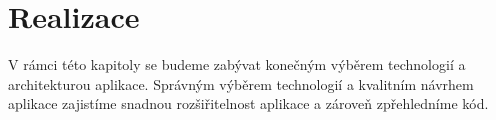 \chapter{Realizace}
\label{ch:implementation}
V rámci této kapitoly se budeme zabývat konečným výběrem technologií a architekturou aplikace. Správným výběrem technologií a kvalitním návrhem aplikace zajistíme snadnou rozšiřitelnost aplikace a zároveň zpřehledníme kód.










